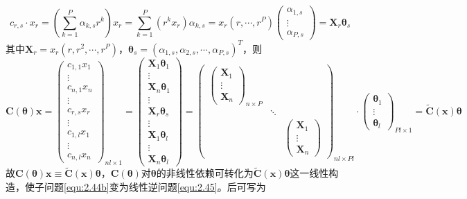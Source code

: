 \documentclass[12pt]{article}
\begin{document}
{\begin{equation}
    c_{r,s}\cdot x_r=\left(\sum_{k=1}^{P} \alpha_{k,s}r^k\right)x_r=\sum_{k=1}^{P} (r^kx_r)\alpha_{k,s}=x_r(r,\cdots,r^P)\begin{pmatrix} \alpha_{1,s} \\ \vdots \\ \alpha_{P,s} \end{pmatrix}=\bm{X}_r\bm{\theta}_s
\end{equation}
其中$\bm{X}_r=x_r(r,r^2,\cdots,r^P)$，$\bm{\theta}_s=(\alpha_{1,s},\alpha_{2,s},\cdots,\alpha_{P,s})^T$，则
\begin{equation}
    \mathbf{C}(\bm{\theta})\bm{x}=\begin{pmatrix}
        c_{1,1}x_1 \\ \vdots \\ c_{n,1}x_n \\
        \vdots \\ c_{r,s}x_r \\ \vdots \\
        c_{1,l}x_1 \\ \vdots \\ c_{n,l}x_n
    \end{pmatrix}_{nl\times 1}=\begin{pmatrix}
        \bm{X}_1\bm{\theta}_1 \\ \vdots \\ \bm{X}_n\bm{\theta}_1 \\
        \vdots \\ \bm{X}_r\bm{\theta}_s \\ \vdots \\
        \bm{X}_1\bm{\theta}_l \\ \vdots \\ \bm{X}_n\bm{\theta}_l
    \end{pmatrix}=\begin{pmatrix}
        \begin{pmatrix} \bm{X}_1 \\ \vdots \\ \bm{X}_n \end{pmatrix}_{n\times P} & & \\
        & \ddots & \\
        & & \begin{pmatrix} \bm{X}_1 \\ \vdots \\ \bm{X}_n \end{pmatrix}
    \end{pmatrix}_{nl\times Pl}\cdot\begin{pmatrix}
        \bm{\theta}_1 \\ \vdots \\ \bm{\theta}_l
    \end{pmatrix}_{Pl\times1}=\tilde{\mathbf{C}}(\bm{x})\bm{\theta}
\end{equation}
故$\mathbf{C}(\bm{\theta})\bm{x}\equiv\tilde{\mathbf{C}}(\bm{x})\bm{\theta}$，$\mathbf{C}(\bm{\theta})$对$\bm{\theta}$的非线性依赖可转化为$\tilde{\mathbf{C}}(\bm{x})\bm{\theta}$这一线性构造，使子问题\autoref{equ:2.44b}变为线性逆问题\autoref{equ:2.45}。}后可写为
\end{document}
